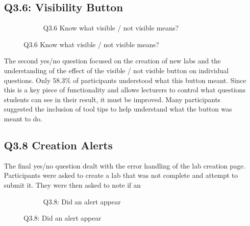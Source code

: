 \documentclass[11pt]{report}
\begin{document}
\subsection*{Q3.6: Visibility Button}

\begin{figure}
\vspace*{-\baselineskip}
\begin{figure}[H]
\caption{Q3.6 Know what visible / not visible means?}


\end{figure}
\end{figure}

The second yes/no question focused on the creation of new labs and the understanding of the effect of the visible / not visible button on individual questions. Only 58.3\% of participants understood what this button meant. Since this is a key piece of functionality and allows lecturers to control what questions students can see in their result, it must be improved. Many participants suggested the inclusion of tool tips to help understand what the button was meant to do. 


\subsection*{Q3.8 Creation Alerts}



The final yes/no question dealt with the error handling of the lab creation page. Participants were asked to create a lab that was not complete and attempt to submit it. They were then asked to note if an

\begin{figure}
\vspace*{-\baselineskip}
\begin{figure}[H]
\caption{Q3.8: Did an alert appear}


\end{figure}
\end{figure}
\end{document}
